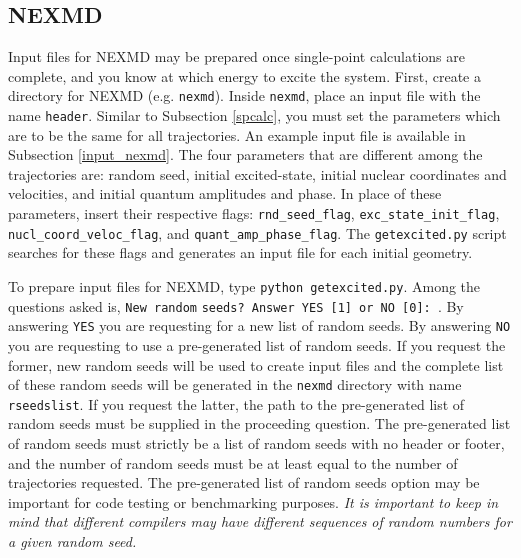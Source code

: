 \documentclass[letterpaper,12pt,titlepage]{article}
\begin{document}
\subsection{NEXMD}
\label{nexmd}
Input files for NEXMD may be prepared once single-point calculations are complete, and you know at which energy to excite the system.  First, create a directory for NEXMD (e.g. \verb+nexmd+).  Inside \verb+nexmd+, place an input file with the name \verb+header+.  Similar to Subsection \ref{spcalc}, you must set the parameters which are to be the same for all trajectories.  An example input file is available in Subsection \ref{input_nexmd}.  The four parameters that are different among the trajectories are: random seed, initial excited-state, initial nuclear coordinates and velocities, and initial quantum amplitudes and phase.  In place of these parameters, insert their respective flags: \verb+rnd_seed_flag+, \verb+exc_state_init_flag+, \verb+nucl_coord_veloc_flag+, and \verb+quant_amp_phase_flag+.  The \verb+getexcited.py+ script searches for these flags and generates an input file for each initial geometry.

To prepare input files for NEXMD, type \verb+python getexcited.py+.  Among the questions asked is, \verb+New random+ \verb+seeds? Answer YES [1] or NO [0]: +.  By answering \verb+YES+ you are requesting for a new list of random seeds.  By answering \verb+NO+ you are requesting to use a pre-generated list of random seeds.  If you request the former, new random seeds will be used to create input files and the complete list of these random seeds will be generated in the \verb+nexmd+ directory with name \verb+rseedslist+.  If you request the latter, the path to the pre-generated list of random seeds must be supplied in the proceeding question.  The pre-generated list of random seeds must strictly be a list of random seeds with no header or footer, and the number of random seeds must be at least equal to the number of trajectories requested.  The pre-generated list of random seeds option may be important for code testing or benchmarking purposes.  \textit{It is important to keep in mind that different compilers may have different sequences of random numbers for a given random seed.}
\end{document}
